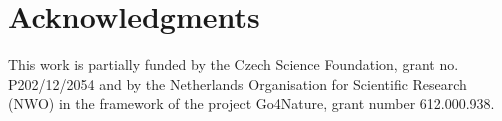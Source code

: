 \documentclass{aamas2015}
\newcounter{vlNoteCounter}
\newcommand{\vlnote}[1]{{\scriptsize \color{blue} $\blacksquare$ \refstepcounter{vlNoteCounter}\textsf{[VL]$_{\arabic{vlNoteCounter}}$:{#1}}}}
\renewcommand{\vlnote}[1]{}
\begin{document}

\section{Acknowledgments}
This work is partially funded by the Czech Science Foundation, grant no. P202/12/2054 and by the Netherlands Organisation for Scientific
Research (NWO) in the framework of the project Go4Nature, grant number 612.000.938.


%

%
%
\end{document}
